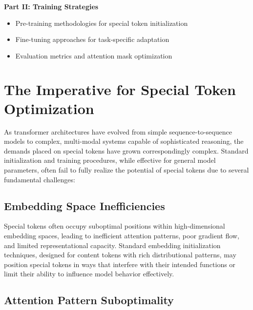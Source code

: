 \textbf{Part II: Training Strategies}  
\begin{itemize}
\item Pre-training methodologies for special token initialization
\item Fine-tuning approaches for task-specific adaptation
\item Evaluation metrics and attention mask optimization
\end{itemize}

\section{The Imperative for Special Token Optimization}

As transformer architectures have evolved from simple sequence-to-sequence models to complex, multi-modal systems capable of sophisticated reasoning, the demands placed on special tokens have grown correspondingly complex. Standard initialization and training procedures, while effective for general model parameters, often fail to fully realize the potential of special tokens due to several fundamental challenges:

\subsection{Embedding Space Inefficiencies}

Special tokens often occupy suboptimal positions within high-dimensional embedding spaces, leading to inefficient attention patterns, poor gradient flow, and limited representational capacity. Standard embedding initialization techniques, designed for content tokens with rich distributional patterns, may position special tokens in ways that interfere with their intended functions or limit their ability to influence model behavior effectively.
\begin{comment}
Feedback: A concrete example would make this much clearer. For instance: "For example, a randomly initialized [CLS] token might start in a 'remote' part of the embedding space, far from the content tokens it needs to aggregate. This forces the model to waste significant training time just learning to move the [CLS] token to a more central, effective location. Optimization techniques can place it in a better starting position, accelerating learning."
\end{comment}

\subsection{Attention Pattern Suboptimality}

